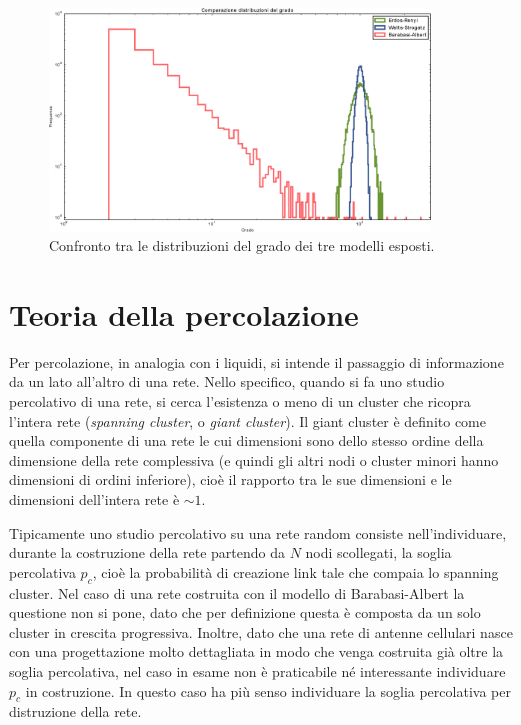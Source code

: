 \begin{figure}[ht!]
	\centering
	\includegraphics[width=0.9\textwidth]{./Immagini/Teoria/compareSameN}
	\caption[Confronto $P(k)$]{Confronto tra le distribuzioni del grado dei tre modelli esposti.}
	\label{fig:confrontoGradi}
\end{figure}

\clearpage
\section{Teoria della percolazione}
\label{sec:percola}
Per percolazione, in analogia con i liquidi, si intende il passaggio di informazione da un lato all'altro di una rete. Nello specifico, quando si fa uno studio percolativo di una rete, si cerca l'esistenza o meno di un cluster che ricopra l'intera rete (\emph{spanning cluster}, o \emph{giant cluster}). Il giant cluster \`e definito come quella componente di una rete le cui dimensioni sono dello stesso ordine della dimensione della rete complessiva (e quindi gli altri nodi o cluster minori hanno dimensioni di ordini inferiore), cio\`e il rapporto tra le sue dimensioni e le dimensioni dell'intera rete \`e $\sim 1$.

Tipicamente uno studio percolativo su una rete random consiste nell'individuare, durante la costruzione della rete partendo da $N$ nodi scollegati, la soglia percolativa $p_c$, cio\`e la probabilit\`a di creazione link tale che compaia lo spanning cluster. Nel caso di una rete costruita con il modello di Barabasi-Albert la questione non si pone, dato che per definizione questa \`e composta da un solo cluster in crescita progressiva. Inoltre, dato che una rete di antenne cellulari nasce con una progettazione molto dettagliata in modo che venga costruita gi\`a oltre la soglia percolativa, nel caso in esame non \`e praticabile n\'e interessante individuare $p_c$ in costruzione. In questo caso ha pi\`u senso individuare la soglia percolativa per distruzione della rete. 

